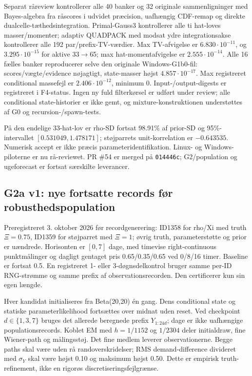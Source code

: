 Separat råreview kontrollerer alle 40 banker og 32 originale sammenligninger
med Bayes-algebra fra råscores i udvidet præcision, uafhængig CDF-remap og
direkte dualcelle-tæthedsintegration. Primal-Gauss3 kontrollerer alle ti
hat-loves masser/momenter; adaptiv QUADPACK med modsat ydre integrationsakse
kontrollerer alle 192 par/prefix-TV-værdier. Max TV-afvigelse er
\(6.830\cdot10^{-11}\), og \(3.295\cdot10^{-15}\) for aktive 33\(\to\)65;
max hat-momentafvigelse er \(2.555\cdot10^{-14}\).
Alle 16 fælles banker reproducerer selve den originale Windows-G1b0-fil:
scores/vægte/evidence nøjagtigt, state-masser højst \(4.857\cdot10^{-17}\).
Max registreret conditional massefejl er \(2.406\cdot10^{-12}\), minimum 0.
Input-/output-digests er registreret i F4-status. Ingen ny fuld filterkørsel
er udført under review; alle conditional state-historier er ikke gemt,
og mixture-konstruktionen understøttes af G0 og recursion-/spawn-tests.

På den endelige 33-hat-lov er rho-SD fortsat 98.91\% af prior-SD og
95\%-intervallet \([0.531049,1.478171]\); støjparrets unit-korrelation er
\(-0.643535\). Numerisk accept er ikke præcis parameteridentifikation.
Linux- og Windows-piloterne er nu rå-reviewet. PR \#54 er merged på
\texttt{014446c}; G2/population og ugeforecast
er fortsat særskilte leverancer.

\subsection{G2a v1: nye fortsatte records før robusthedspopulation}
Preregistreret 3. oktober 2026 før recordgenerering: ID1358 for rho/Xi med
truth \(\Xi=0.75\), ID1359 for støjparret med \(\Xi=1\); øvrig truth,
parameterstøtte og prior er uændrede. Horisonten er \([0,7]\) dage,
med timevise right-continuous punktmålinger og dagligt gentaget
pris 0.65/0.35/0.65 ved 0/8/16 timer. Baseline er fortsat 0.5.
En registreret 1- eller 3-døgnsdelkontrol bruger samme per-ID RNG-strømme
og samme prefix af observationsrecorden. Den certificerer kun sin egen længde.

Hver kandidat initialiseres fra Beta(20,20) én gang. Dens conditional
state og statiske parameterlikelihood fortsættes over midnat uden reset.
Ved checkpoint \(d\in\{1,3,7\}\) bruges det allerede beregnede prefix
\(Y_{1:24d}\); dage er ikke uafhængige populationsrecords.
Koblet EM med \(h=1/1152\) og \(1/2304\) deler initialdraw, fine Wiener-path
og målingsstøj. Det fine medlem leverer observationerne. Begge paths skal
være uden rå randoverskridelser; RMS demand-difference divideret med
\(\sigma_Y\) skal være højst 0.10 og maksimum højst 0.50.
Dette er empirisk truth-refinement, ikke en rigorøs discretiseringsfejlgrænse.


